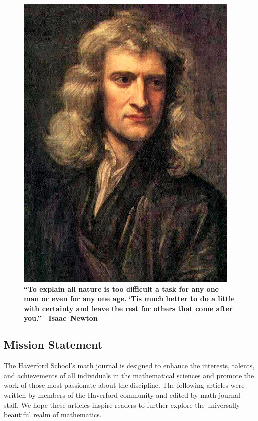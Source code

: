 \documentclass[12pt]{article}
\begin{document}
\setcounter{tocdepth}{1}


\begin{figure}[H]
    \centering \includegraphics[scale=1]{newton.jpg}
    \\
    \textbf{\large{``To explain all nature is too difficult a task for any one man or even for any one age. `Tis much better to do a little with certainty and leave the rest for others that come after you.'' --Isaac~Newton}}
\end{figure}


\begin{spacing}{1.0}
\tableofcontents
\end{spacing}

\newpage
\subsection*{Mission Statement}
The Haverford School’s math journal is designed to enhance the interests, talents, and achievements of all individuals in the mathematical sciences and promote the work of those most passionate about the discipline. The following articles were written by members of the Haverford community and edited by math journal staff. We hope these articles inspire readers to further explore the universally beautiful realm of mathematics.
\end{document}
